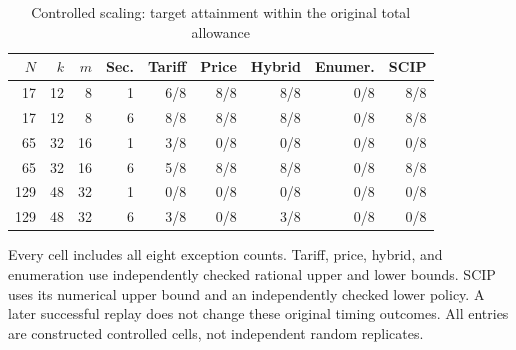\documentclass[11pt,letterpaper]{article}
\theoremstyle{definition}\newtheorem{remark}[theorem]{Remark}
\begin{document}
\begin{table}[p]\centering\caption{Controlled scaling: target attainment within the original total allowance}\label{tab:scaling63}
\begin{singlespace}\small\begin{tabular}{rrrrrrrrr}\toprule
$N$ & $k$ & $m$ & Sec. & Tariff & Price & Hybrid & Enumer. & SCIP\\\midrule
17 & 12 & 8 & 1 & 6/8 & 8/8 & 8/8 & 0/8 & 8/8 \\
17 & 12 & 8 & 6 & 8/8 & 8/8 & 8/8 & 0/8 & 8/8 \\
65 & 32 & 16 & 1 & 3/8 & 0/8 & 0/8 & 0/8 & 0/8 \\
65 & 32 & 16 & 6 & 5/8 & 8/8 & 8/8 & 0/8 & 8/8 \\
129 & 48 & 32 & 1 & 0/8 & 0/8 & 0/8 & 0/8 & 0/8 \\
129 & 48 & 32 & 6 & 3/8 & 0/8 & 3/8 & 0/8 & 0/8 \\
\bottomrule\end{tabular}\par\smallskip\begin{minipage}{\textwidth}\footnotesize Every cell includes all eight exception counts. Tariff, price, hybrid, and enumeration use independently checked rational upper and lower bounds. SCIP uses its numerical upper bound and an independently checked lower policy. A later successful replay does not change these original timing outcomes. All entries are constructed controlled cells, not independent random replicates.\end{minipage}\end{singlespace}\end{table}
\end{document}
